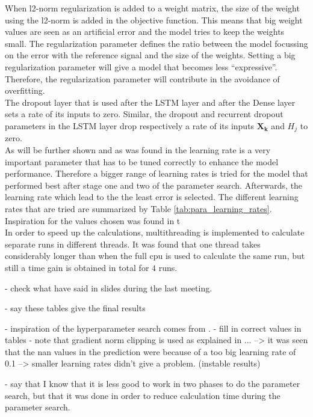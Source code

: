 When l2-norm regularization is added to a weight matrix, the size of the weight using the l2-norm is added in the objective function. This means that big weight values are seen as an artificial error and the model tries to keep the weights small. The regularization parameter defines the ratio between the model focussing on the error with the reference signal and the size of the weights. Setting a big regularization parameter will give a model that becomes less ``expressive''. Therefore, the regularization parameter will contribute in the avoidance of overfitting.\\ 
The dropout layer that is used after the LSTM layer and after the Dense layer sets a rate of its inputs to zero. Similar, the dropout and recurrent dropout parameters in the LSTM layer drop respectively a rate of its inputs $ \bm{X_{k}} $ and $ H_{j} $ to zero. \\

As will be further shown and as was found in \cite{Greff2017} the learning rate is a very important parameter that has to be tuned correctly to enhance the model performance. Therefore a bigger range of learning rates is tried for the model that performed best after stage one and two of the parameter search. Afterwards, the learning rate which lead to the the least error is selected. The different learning rates that are tried are summarized by Table \ref{tab:para_learning_rates}. Inspiration for the values chosen was found in t\\

In order to speed up the calculations, multithreading is implemented to calculate separate runs in different threads. It was found that one thread takes considerably longer than when the full cpu is used to calculate the same run, but still a time gain is obtained in total for $ 4 $ runs.




- check what have said in slides during the last meeting. 


- say these tables give the final results


- inspiration of the hyperparameter search comes from .
- fill in correct values in tables
- note that gradient norm clipping is used as explained in ... --> it was seen that the nan values in the prediction were because of a too big learning rate of 0.1 --> smaller learning rates didn't give a problem. (instable results)

- say that I know that it is less good to work in two phases to do the parameter search, but that it was done in order to reduce calculation time during the parameter search. 

